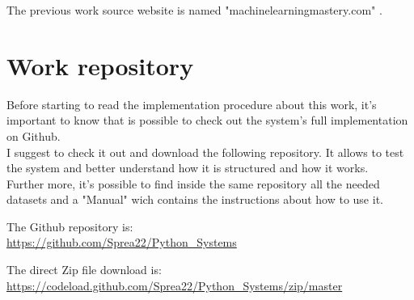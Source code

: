 The previous work source website is named "machinelearningmastery.com" \cite{previousWork}.


\section{Work repository}
\label{Repository}
Before starting to read the implementation procedure about this work, it's important to know that is possible to check out the system's full implementation on Github.\\
I suggest to check it out and download the following repository. It allows to test the system and better understand how it is structured and how it works.\\
Further more, it's possible to find inside the same repository all the needed datasets and a "Manual" wich contains the instructions about how to use it.

The Github repository is:\\
\url{https://github.com/Sprea22/Python_Systems}

The direct Zip file download is:\\
\url{https://codeload.github.com/Sprea22/Python_Systems/zip/master}

